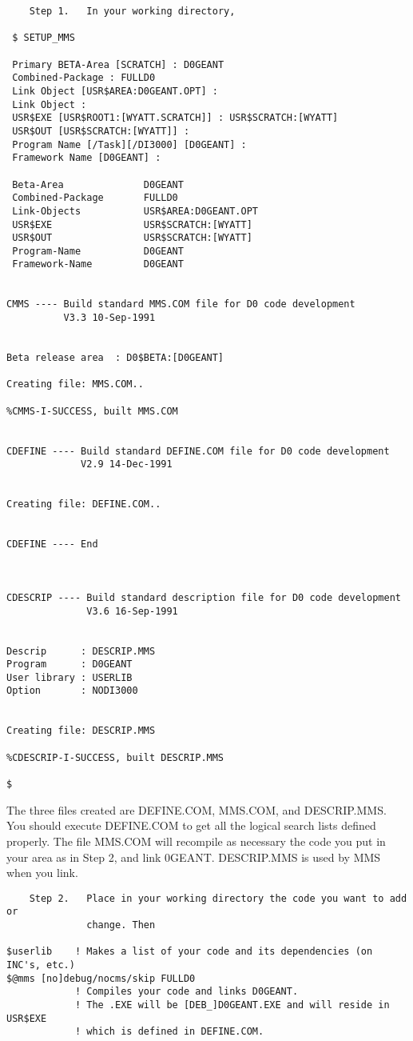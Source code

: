\begin{verbatim}
    Step 1.   In your working directory,

 $ SETUP_MMS

 Primary BETA-Area [SCRATCH] : D0GEANT
 Combined-Package : FULLD0
 Link Object [USR$AREA:D0GEANT.OPT] :
 Link Object :
 USR$EXE [USR$ROOT1:[WYATT.SCRATCH]] : USR$SCRATCH:[WYATT]
 USR$OUT [USR$SCRATCH:[WYATT]] :
 Program Name [/Task][/DI3000] [D0GEANT] :
 Framework Name [D0GEANT] :

 Beta-Area              D0GEANT
 Combined-Package       FULLD0
 Link-Objects           USR$AREA:D0GEANT.OPT
 USR$EXE                USR$SCRATCH:[WYATT]
 USR$OUT                USR$SCRATCH:[WYATT]
 Program-Name           D0GEANT
 Framework-Name         D0GEANT


CMMS ---- Build standard MMS.COM file for D0 code development
          V3.3 10-Sep-1991


Beta release area  : D0$BETA:[D0GEANT]

Creating file: MMS.COM..

%CMMS-I-SUCCESS, built MMS.COM


CDEFINE ---- Build standard DEFINE.COM file for D0 code development
             V2.9 14-Dec-1991


Creating file: DEFINE.COM..


CDEFINE ---- End



CDESCRIP ---- Build standard description file for D0 code development
              V3.6 16-Sep-1991


Descrip      : DESCRIP.MMS
Program      : D0GEANT
User library : USERLIB
Option       : NODI3000


Creating file: DESCRIP.MMS

%CDESCRIP-I-SUCCESS, built DESCRIP.MMS

$
\end{verbatim}

The three files created are DEFINE.COM, MMS.COM, and DESCRIP.MMS. You should
execute DEFINE.COM to get all the logical search lists defined properly. The
file MMS.COM will recompile as necessary the code you put in your area as in
Step 2, and link \D0GEANT. DESCRIP.MMS is used by MMS when you link.

\begin{verbatim}
    Step 2.   Place in your working directory the code you want to add or
              change. Then

$userlib    ! Makes a list of your code and its dependencies (on INC's, etc.)
$@mms [no]debug/nocms/skip FULLD0 
            ! Compiles your code and links D0GEANT.
            ! The .EXE will be [DEB_]D0GEANT.EXE and will reside in USR$EXE
            ! which is defined in DEFINE.COM.
\end{verbatim}

